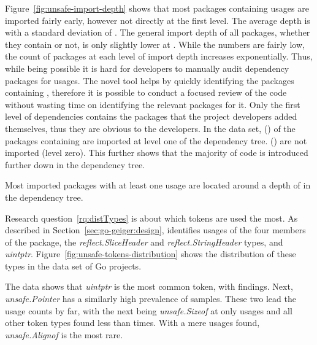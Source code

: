 Figure~\ref{fig:unsafe-import-depth} shows that most packages containing \unsafe{} usages are imported fairly early,
however not directly at the first level.
The average depth is \averageUnsafeImportDepth{} with a standard deviation of \stdUnsafeImportDepth{}.
The general import depth of all packages, whether they contain \unsafe{} or not, is only slightly lower at
\averageGeneralImportDepth{}.
While the numbers are fairly low, the count of packages at each level of import depth increases exponentially.
Thus, while being possible it is hard for developers to manually audit dependency packages for \unsafe{} usages.
The novel \toolGeiger{} tool helps by quickly identifying the packages containing \unsafe{}, therefore it is possible to
conduct a focused review of the \unsafe{} code without wasting time on identifying the relevant packages for it.
Only the first level of dependencies contains the packages that the project developers added themselves, thus they are
obvious to the developers.
In the data set, \levelOneImportedUnsafePackagesCount{} (\levelOneImportedUnsafePackagesShare{}) of the
\unsafePackages{} packages containing \unsafe{} are imported at level one of the dependency tree.
\levelZeroImportedUnsafePackagesCount{} (\levelZeroImportedUnsafePackagesShare{}) are not imported (level zero).
This further shows that the majority of \unsafe{} code is introduced further down in the dependency tree.

\begin{answerToRQ}[\ref{rq:depsDepth}]
    Most imported packages with at least one \unsafe{} usage are located around a depth of
    \averageUnsafeImportDepthRounded{} in the dependency tree.
\end{answerToRQ}

Research question~\ref{rq:distTypes} is about which \unsafe{} tokens are used the most.
As described in Section~\ref{sec:go-geiger:design}, \toolGeiger{} identifies usages of the four members of the \unsafe{}
package, the \textit{reflect.SliceHeader} and \textit{reflect.StringHeader} types, and \textit{uintptr}.
Figure~\ref{fig:unsafe-tokens-distribution} shows the distribution of these \unsafe{} types in the data set of Go
projects.



The data shows that \textit{uintptr} is the most common \unsafe{} token, with  findings.
Next, \textit{unsafe.Pointer} has a similarly high prevalence of  samples.
These two lead the usage counts by far, with the next being \textit{unsafe.Sizeof} at only  usages and
all other token types found less than  times.
With a mere  usages found, \textit{unsafe.Alignof} is the most rare.

